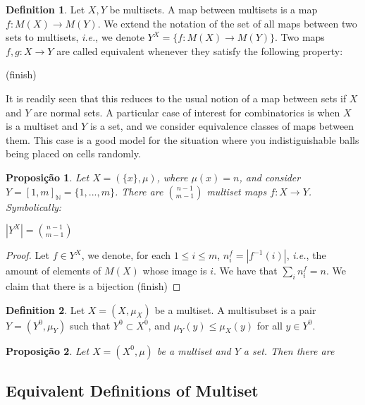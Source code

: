 \documentclass[]{article}
\newtheorem{proposition}{Proposição}[section]
\theoremstyle{definition}
\newtheorem{definition}{Definition}[section]
\theoremstyle{definition}
\newcommand{\raw}{\rightarrow}
\newcommand{\ie}{\textit{i.e.}}
\newcommand{\bb}{\mathbb}
\newcommand{\mum}{^{-1}}
\begin{document}
	\begin{definition}
		Let $X, Y$ be multisets. A map between multisets is a map $f:M(X) \raw M(Y)$. We extend the notation of the set of all maps between two sets to multisets, \ie, we denote $Y^X=\{f:M(X) \raw M(Y) \}$. Two maps $f, g: X \raw Y$ are called equivalent whenever they satisfy the following property:
		
		\begin{center}
			(finish)
		\end{center}
	\end{definition}
	
	It is readily seen that this reduces to the usual notion of a map between sets if $X$ and $Y$ are normal sets. A particular case of interest for combinatorics is when $X$ is a multiset and $Y$ is a set, and we consider equivalence classes of maps between them. This case is a good model for the situation where you indistiguishable balls being placed on cells randomly.
	
	\begin{proposition}
		Let $X=(\{x\}, \mu)$, where $\mu(x) = n$, and consider $Y = [1, m]_{\bb{N}} = \{1, ..., m \}$. There are $\binom{n-1}{m-1}$ multiset maps $f:X \raw Y$. Symbolically:
		
		\begin{center}
			$|Y^X|= \binom{n-1}{m-1}$
		\end{center}
	\end{proposition}
	
	\begin{proof}
		Let $f \in Y^X$, we denote, for each $1 \leq i \leq m$, $n_i^f=|f\mum(i)|$, \ie, the amount of elements of $M(X)$ whose image is $i$. We have that $\sum_i n_i^f = n$. We claim that there is a bijection (finish)
	\end{proof}
	
	\begin{definition}
		Let $X=(X, \mu_X)$ be a multiset. A multisubset is a pair $Y=(Y^0, \mu_Y)$ such that $Y^0 \subset X^0$, and $\mu_Y(y)\leq\mu_X(y)$ for all $y \in Y^0$.
	\end{definition}
	
	\begin{proposition}
		Let $X=(X^0, \mu)$ be a multiset and $Y$ a set. Then there are 
	\end{proposition}
	
	
	
	\subsection{Equivalent Definitions of Multiset}
	
\end{document}

